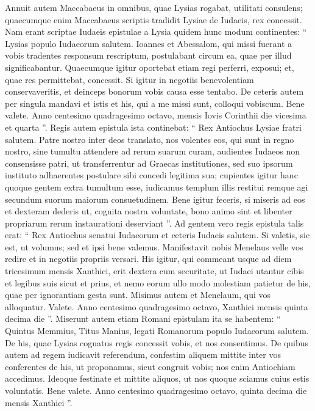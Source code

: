 \begin{biblechapter}
\begin{biblechapter}
\begin{biblechapter}
\begin{biblechapter}
\begin{biblechapter}
\begin{biblechapter}
\begin{biblechapter}
\begin{biblechapter}
\begin{biblechapter}
\begin{biblechapter}
\begin{biblechapter}
\verse Annuit autem Maccabaeus in omnibus, quae Lysias rogabat, utilitati consulens; quaecumque enim Maccabaeus scriptis tradidit Lysiae de Iudaeis, rex concessit.
 \verse Nam erant scriptae Iudaeis epistulae a Lysia quidem hunc modum continentes: “ Lysias populo Iudaeorum salutem. 
\verse Ioannes et Abessalom, qui missi fuerant a vobis tradentes responsum rescriptum, postulabant circum ea, quae per illud significabantur. 
\verse Quaecumque igitur oportebat etiam regi perferri, exposui; et, quae res permittebat, concessit. 
\verse Si igitur in negotiis benevolentiam conservaveritis, et deinceps bonorum vobis causa esse tentabo. 
 \verse De ceteris autem per singula mandavi et istis et his, qui a me missi sunt, colloqui vobiscum. 
\verse Bene valete. Anno centesimo quadragesimo octavo, mensis Iovis Corinthii die vicesima et quarta ”.
 \verse Regis autem epistula ista continebat: “ Rex Antiochus Lysiae fratri salutem. 
 \verse Patre nostro inter deos translato, nos volentes eos, qui sunt in regno nostro, sine tumultu attendere ad rerum suarum curam, 
\verse audientes Iudaeos non consensisse patri, ut transferrentur ad Graecas institutiones, sed suo ipsorum instituto adhaerentes postulare sibi concedi legitima sua; 
\verse cupientes igitur hanc quoque gentem extra tumultum esse, iudicamus templum illis restitui remque agi secundum suorum maiorum consuetudinem. 
\verse Bene igitur feceris, si miseris ad eos et dexteram dederis ut, cognita nostra voluntate, bono animo sint et libenter propriarum rerum instaurationi deserviant ”.
 \verse Ad gentem vero regis epistula talis erat: “ Rex Antiochus senatui Iudaeorum et ceteris Iudaeis salutem. 
\verse Si valetis, sic est, ut volumus; sed et ipsi bene valemus. 
\verse Manifestavit nobis Menelaus velle vos redire et in negotiis propriis versari. 
\verse His igitur, qui commeant usque ad diem tricesimum mensis Xanthici, erit dextera cum securitate, 
\verse ut Iudaei utantur cibis et legibus suis sicut et prius, et nemo eorum ullo modo molestiam patietur de his, quae per ignorantiam gesta sunt. 
\verse Misimus autem et Menelaum, qui vos alloquatur. 
\verse Valete. Anno centesimo quadragesimo octavo, Xanthici mensis quinta decima die ”.
 \verse Miserunt autem etiam Romani epistulam ita se habentem: “ Quintus Memmius, Titus Manius, legati Romanorum populo Iudaeorum salutem. 
\verse De his, quae Lysias cognatus regis concessit vobis, et nos consentimus. 
\verse De quibus autem ad regem iudicavit referendum, confestim aliquem mittite inter vos conferentes de his, ut proponamus, sicut congruit vobis; nos enim Antiochiam accedimus. 
\verse Ideoque festinate et mittite aliquos, ut nos quoque sciamus cuius estis voluntatis. 
\verse Bene valete. Anno centesimo quadragesimo octavo, quinta decima die mensis Xanthici ”.
 

\end{biblechapter}
\end{biblechapter}
\end{biblechapter}
\end{biblechapter}
\end{biblechapter}
\end{biblechapter}
\end{biblechapter}
\end{biblechapter}
\end{biblechapter}
\end{biblechapter}
\end{biblechapter}
